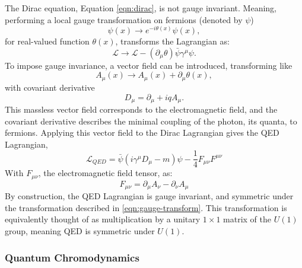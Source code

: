         The Dirac equation, Equation \ref{eqn:dirac}, is not gauge invariant. Meaning, performing a local gauge transformation on fermions (denoted by $\psi$)
        \begin{equation} \label{eqn:gauge-transform}
            \psi(x) \rightarrow e^{-i\theta(x)}\psi(x),
        \end{equation}        
        for real-valued function $\theta(x)$, transforms the Lagrangian as:
        \begin{equation}
            \mathcal{L} \rightarrow \mathcal{L} - (\partial_{\mu}\theta)\bar{\psi}\gamma^{\mu}\psi.
        \end{equation}
        To impose gauge invariance, a vector field can be introduced, transforming like
        \begin{equation}
            A_{\mu}(x) \rightarrow A_{\mu}(x) + \partial_{\mu}\theta(x),
        \end{equation}
        with covariant derivative
        \begin{equation}
            D_{\mu} = \partial_{\mu} + iqA_{\mu}.
        \end{equation}
        This massless vector field corresponds to the electromagnetic field, and the covariant derivative describes the minimal coupling of the photon, its quanta, to fermions. Applying this vector field to the Dirac Lagrangian gives the \gls{QED} Lagrangian,
        \begin{equation}
            \mathcal{L}_{QED} = \bar{\psi} (i \gamma^{\mu} D_{\mu} - m)\psi - \frac{1}{4} F_{\mu \nu}F^{\mu \nu}
        \end{equation}
        With $F_{\mu \nu}$, the electromagnetic field tensor, as:
        \begin{equation}
        F_{\mu \nu} = \partial_{\mu}A_{\nu} - \partial_{\nu}A_{\mu}
        \end{equation}
        By construction, the \gls{QED} Lagrangian is gauge invariant, and symmetric under the transformation described in \ref{eqn:gauge-transform}. This transformation is equivalently thought of as multiplication by a unitary $1 \times 1$ matrix of the $U(1)$ group, meaning \gls{QED} is symmetric under $U(1)$.


        \subsubsection{Quantum Chromodynamics}

